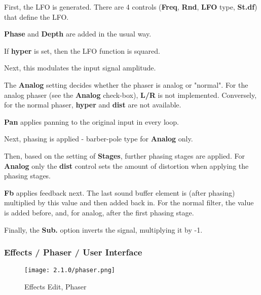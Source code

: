    \begin{enumber}
      \item First, the LFO is generated.
         There are 4 controls
         (\textbf{Freq}, \textbf{Rnd}, \textbf{LFO} type, \textbf{St.df})
         that define the LFO.
      \item \textbf{Phase} and \textbf{Depth} are added in the usual way.
      \item If \textbf{hyper} is set, then the LFO function is squared.
      \item Next, this modulates the input signal amplitude.
      \item The \textbf{Analog} setting decides whether the phaser is analog
            or "normal".
            For the analog phaser (see the \textbf{Analog} check-box),
            \textbf{L/R} is not implemented.
            Conversely, for the normal phaser, \textbf{hyper} and \textbf{dist}
            are not available.
      \item \textbf{Pan} applies panning to the original input in every loop.
      \item Next, phasing is applied - barber-pole type for \textbf{Analog} only.
      \item Then, based on the setting of \textbf{Stages}, further phasing
            stages are applied.
            For \textbf{Analog} only the \textbf{dist} control sets the amount of
            distortion when applying the phasing stages.
      \item \textbf{Fb} applies feedback next. The last sound buffer element is (after
            phasing) multiplied by this value and then added back in. For the
            normal filter, the value is added before, and, for analog, after the
            first phasing stage.
      \item Finally, the \textbf{Sub.} option inverts the signal, multiplying it
            by -1.
   \end{enumber}

\subsubsection{Effects / Phaser / User Interface}
\label{subsubsec:effects_edit_phaser_ui}

\begin{figure}[H]
   \centering
   \texttt{[image: 2.1.0/phaser.png]}
   \caption{Effects Edit, Phaser}
   \label{fig:effects_edit_phaser}
\end{figure}

